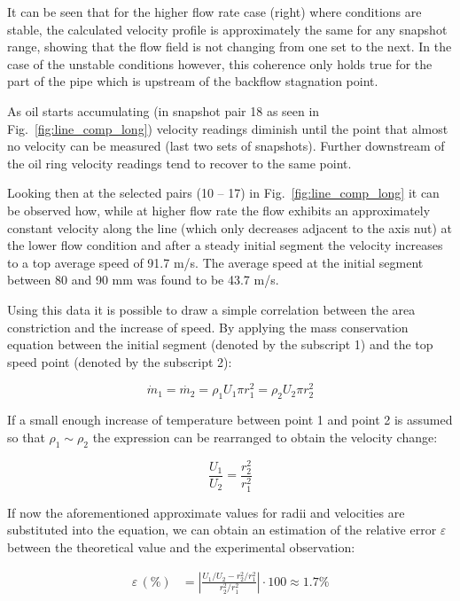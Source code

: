 It can be seen that for the higher flow rate case (right) where conditions are stable, the calculated velocity profile is approximately the same for any snapshot range, showing that the flow field is not changing from one set to the next. In the case of the unstable conditions however, this coherence only holds true for the part of the pipe which is upstream of the backflow stagnation point.

As oil starts accumulating (in snapshot pair 18 as seen in Fig.~\ref{fig:line_comp_long}) velocity readings diminish until the point that almost no velocity can be measured (last two sets of snapshots). Further downstream of the oil ring velocity readings tend to recover to the same point.

Looking then at the selected pairs (10 -- 17) in Fig.~\ref{fig:line_comp_long} it can be observed how, while at higher flow rate the flow exhibits an approximately constant velocity along the line (which only decreases adjacent to the axis nut) at the lower flow condition and after a steady initial segment the velocity increases to a top average speed of 91.7 m/s. The average speed at the initial segment between 80 and 90 mm was found to be 43.7 m/s.

Using this data it is possible to draw a simple correlation between the area constriction and the increase of speed. By applying the mass conservation equation between the initial segment (denoted by the subscript 1) and the top speed point (denoted by the subscript 2):

\begin{equation}
  \dot{m}_1 = \dot{m_2} = \rho_1 U_1 \pi r_1^2 = \rho_2 U_2 \pi r_2^2
\end{equation}

If a small enough increase of temperature between point 1 and point 2 is assumed so that $\rho_1\sim\rho_2$ the expression can be rearranged to obtain the velocity change:

\begin{equation}
  \frac{U_1}{U_2} = \frac{r_2^2}{r_1^2}
\end{equation}

If now the aforementioned approximate values for radii and velocities are substituted into the equation, we can obtain an estimation of the relative error $\varepsilon$ between the theoretical value and the experimental observation:

\begin{align}
  \varepsilon\, (\%) &= \left|\frac{U_1/U_2-r_2^2/r_1^2}{r_2^2/r_1^2}\right| \cdot 100 \approx 1.7\%
\end{align}

